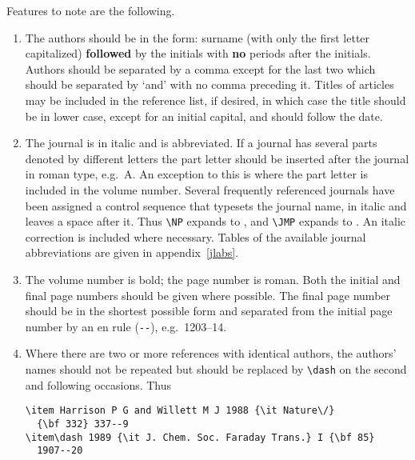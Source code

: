 Features to note are the following.
\begin{enumerate}
\item The authors should be in the form: surname (with only the first 
letter capitalized) {\bf followed} by the initials with {\bf no} 
periods after the initials. Authors should be separated by a comma 
except for the last two which should be separated by `and' with no 
comma preceding it. Titles of articles may be included in the  
reference list, if desired, in which case 
the title should be in lower case, except for an initial 
capital, and should follow the date.

\item The journal is in italic and is 
abbreviated. If a journal has 
several parts denoted by different letters the part letter should be 
inserted after the journal in roman type, e.g.\ \PR A. An 
exception to this is \PL where the part letter is 
included in the volume number. Several frequently referenced journals 
have been assigned a control sequence that typesets the journal name, 
in italic and leaves a space after it. 
Thus \verb"\NP" expands to \NP, and \verb"\JMP" 
expands to \JMP. An italic correction is included 
where necessary. Tables of the available journal abbreviations are 
given in appendix~\ref{jlabs}.

\item The volume number is bold; the page number is roman. Both the 
initial and final page numbers should be given where possible. The 
final page number should be in the shortest possible form and 
separated from the initial page number by an en rule (\verb"--"), e.g.\ 
1203--14.

\item Where there are two or more references with identical authors, 
the authors' names should not be repeated but should be replaced by 
\verb"\dash" on the second and following occasions. Thus
\begin{verbatim}
\item Harrison P G and Willett M J 1988 {\it Nature\/} 
  {\bf 332} 337--9
\item\dash 1989 {\it J. Chem. Soc. Faraday Trans.} I {\bf 85} 
  1907--20
\end{verbatim}
\end{enumerate}


